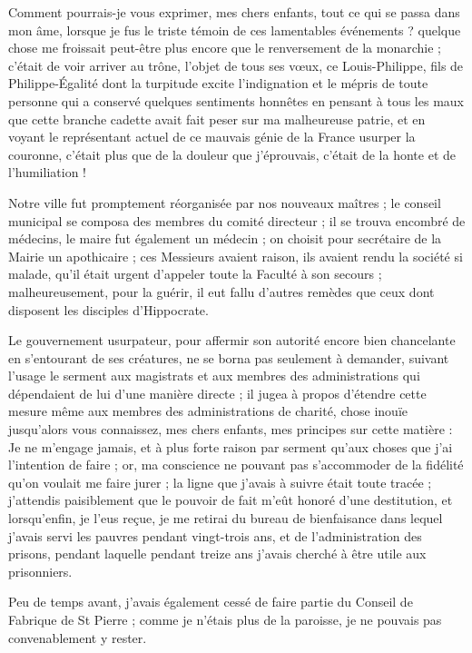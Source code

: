 \documentclass[11pt,a4paper]{report}
\begin{document}
Comment pourrais-je vous exprimer, mes chers enfants, tout ce qui se passa dans mon âme, lorsque je fus le triste témoin de ces lamentables événements ? quelque chose me froissait peut-être plus encore que le renversement de la monarchie ; c'était de voir arriver au trône, l'objet de tous ses vœux, ce Louis-Philippe, fils de Philippe-Égalité dont la turpitude excite l'indignation et le mépris de toute personne qui a conservé quelques sentiments honnêtes en pensant à tous les maux que cette branche cadette avait fait peser sur ma malheureuse patrie, et en voyant le représentant actuel de ce mauvais génie de la France usurper la couronne, c'était plus que de la douleur que j'éprouvais, c'était de la honte et de l'humiliation !

Notre ville fut promptement réorganisée par nos nouveaux maîtres ; le conseil municipal se composa des membres du comité directeur ; il se trouva encombré de médecins, le maire fut également un médecin ; on choisit pour secrétaire de la Mairie un apothicaire ; ces Messieurs avaient raison, ils avaient rendu la société si malade, qu'il était urgent d'appeler toute la Faculté à son secours ; malheureusement, pour la guérir, il eut fallu d'autres remèdes que ceux dont disposent les disciples d'Hippocrate.

Le gouvernement usurpateur, pour affermir son autorité encore bien chancelante en s'entourant de ses créatures, ne se borna pas seulement à demander, suivant l'usage le serment aux magistrats et aux membres des administrations qui dépendaient de lui d'une manière directe ; il jugea à propos d'étendre cette mesure même aux membres des administrations de charité, chose inouïe jusqu'alors vous connaissez, mes chers enfants, mes principes sur cette matière : Je ne m'engage jamais, et à plus forte raison par serment qu'aux choses que j'ai l'intention de faire ; or, ma conscience ne pouvant pas s'accommoder de la fidélité qu'on voulait me faire jurer ; la ligne que j'avais à suivre était toute tracée ; j'attendis paisiblement que le pouvoir de fait m'eût honoré d'une destitution, et lorsqu'enfin, je l'eus reçue, je me retirai du bureau de bienfaisance dans lequel j'avais servi les pauvres pendant vingt-trois ans, et de l'administration des prisons, pendant laquelle pendant treize ans j'avais cherché à être utile aux prisonniers.

Peu de temps avant, j'avais également cessé de faire partie du Conseil de Fabrique de St Pierre ; comme je n'étais plus de la paroisse, je ne pouvais pas convenablement y rester.
\end{document}
